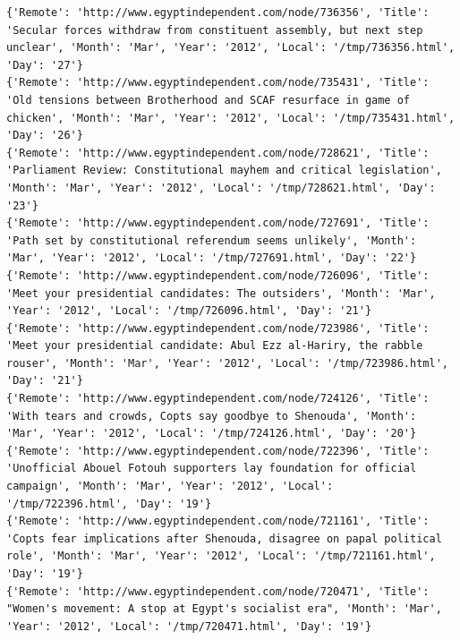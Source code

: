 \documentclass[11pt]{article}
\begin{document}
\begin{verbatim}
{'Remote': 'http://www.egyptindependent.com/node/736356', 'Title': 'Secular forces withdraw from constituent assembly, but next step unclear', 'Month': 'Mar', 'Year': '2012', 'Local': '/tmp/736356.html', 'Day': '27'}
{'Remote': 'http://www.egyptindependent.com/node/735431', 'Title': 'Old tensions between Brotherhood and SCAF resurface in game of chicken', 'Month': 'Mar', 'Year': '2012', 'Local': '/tmp/735431.html', 'Day': '26'}
{'Remote': 'http://www.egyptindependent.com/node/728621', 'Title': 'Parliament Review: Constitutional mayhem and critical legislation', 'Month': 'Mar', 'Year': '2012', 'Local': '/tmp/728621.html', 'Day': '23'}
{'Remote': 'http://www.egyptindependent.com/node/727691', 'Title': 'Path set by constitutional referendum seems unlikely', 'Month': 'Mar', 'Year': '2012', 'Local': '/tmp/727691.html', 'Day': '22'}
{'Remote': 'http://www.egyptindependent.com/node/726096', 'Title': 'Meet your presidential candidates: The outsiders', 'Month': 'Mar', 'Year': '2012', 'Local': '/tmp/726096.html', 'Day': '21'}
{'Remote': 'http://www.egyptindependent.com/node/723986', 'Title': 'Meet your presidential candidate: Abul Ezz al-Hariry, the rabble rouser', 'Month': 'Mar', 'Year': '2012', 'Local': '/tmp/723986.html', 'Day': '21'}
{'Remote': 'http://www.egyptindependent.com/node/724126', 'Title': 'With tears and crowds, Copts say goodbye to Shenouda', 'Month': 'Mar', 'Year': '2012', 'Local': '/tmp/724126.html', 'Day': '20'}
{'Remote': 'http://www.egyptindependent.com/node/722396', 'Title': 'Unofficial Abouel Fotouh supporters lay foundation for official campaign', 'Month': 'Mar', 'Year': '2012', 'Local': '/tmp/722396.html', 'Day': '19'}
{'Remote': 'http://www.egyptindependent.com/node/721161', 'Title': 'Copts fear implications after Shenouda, disagree on papal political role', 'Month': 'Mar', 'Year': '2012', 'Local': '/tmp/721161.html', 'Day': '19'}
{'Remote': 'http://www.egyptindependent.com/node/720471', 'Title': "Women's movement: A stop at Egypt's socialist era", 'Month': 'Mar', 'Year': '2012', 'Local': '/tmp/720471.html', 'Day': '19'}
\end{verbatim}
\end{document}
